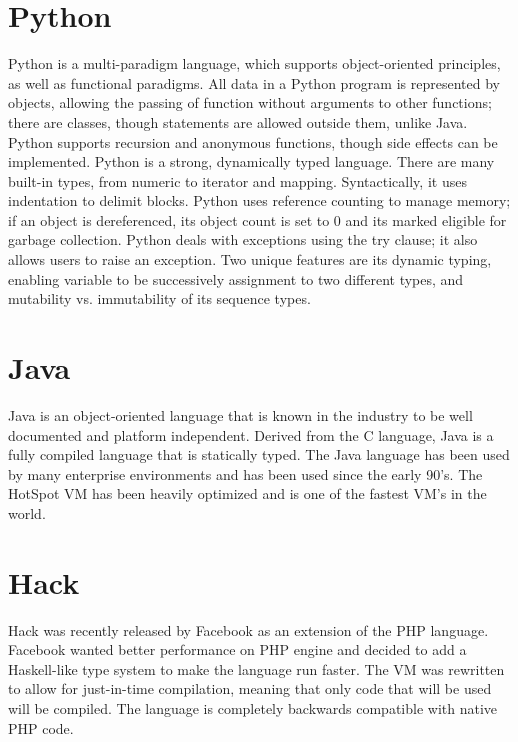 \documentclass[letterpaper,twocolumn,10pt]{article}
\begin{document}
\section{Python}
Python is a multi-paradigm language, which supports object-oriented principles, as well as functional paradigms. All data in a Python program is represented by objects, allowing the passing of function without arguments to other functions; there are classes, though statements are allowed outside them, unlike Java. Python supports recursion and anonymous functions, though side effects can be implemented. Python is a strong, dynamically typed language. There are many built-in types, from numeric to iterator and mapping. Syntactically, it uses indentation to delimit blocks. Python uses reference counting to manage memory; if an object is dereferenced, its object count is set to 0 and its marked eligible for garbage collection. Python deals with exceptions using the try clause; it also allows users to raise an exception. Two unique features are its dynamic typing, enabling variable to be successively assignment to two different types, and mutability vs. immutability of its sequence types.

\section{Java}
Java is an object-oriented language that is known in the industry to be well documented and platform independent. Derived from the C language, Java is a fully compiled language that is statically typed. The Java language has been used by many enterprise environments and has been used since the early 90’s. The HotSpot VM has been heavily optimized and is one of the fastest VM’s in the world.

\section{Hack}
Hack was recently released by Facebook as an extension of the PHP language. Facebook wanted better performance on PHP engine and decided to add a Haskell-like type system to make the language run faster. The VM was rewritten to allow for just-in-time compilation, meaning that only code that will be used will be compiled. The language is completely backwards compatible with native PHP code.
\end{document}
